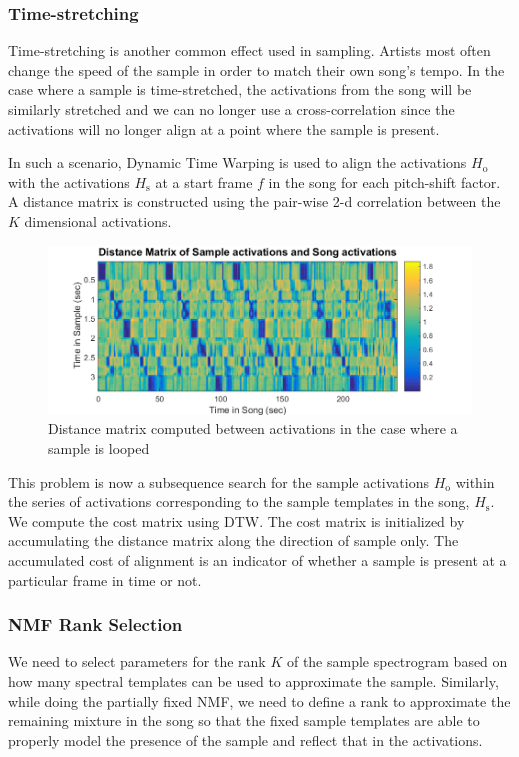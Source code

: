 \documentclass{article}
\begin{document}
\subsubsection{Time-stretching}

Time-stretching is another common effect used in sampling. Artists most often change the speed of the sample in order to match their own song's tempo. In the case where a sample is time-stretched, the activations from the song will be similarly stretched and we can no longer use a cross-correlation since the activations will no longer align at a point where the sample is present.

In such a scenario, Dynamic Time Warping is used to align the activations $H_\mathrm{o}$ with the activations $H_\mathrm{s}$ at a start frame $f$ in the song for each pitch-shift factor. A distance matrix is constructed using the pair-wise 2-d correlation between the $K$ dimensional activations. 
\begin{figure}[!ht]
\centering
\includegraphics[width=\linewidth]{distmat.png}
\caption{Distance matrix computed between activations in the case where a sample is looped}
\label{fig2}
\end{figure}

This problem is now a subsequence search for the sample activations $H_\mathrm{o}$ within the series of activations corresponding to the sample templates in the song, $H_\mathrm{s}$. We compute the cost matrix using DTW. The cost matrix is initialized by accumulating the distance matrix along the direction of sample only. The accumulated cost of alignment is an indicator of whether a sample is present at a particular frame in time or not. 

\subsubsection{NMF Rank Selection}
\label{nmfrank}

We need to select parameters for the rank $K$ of the sample spectrogram based on how many spectral templates can be used to approximate the sample. Similarly, while doing the partially fixed NMF, we need to define a rank to approximate the remaining mixture in the song so that the fixed sample templates are able to properly model the presence of the sample and reflect that in the activations.
\end{document}
